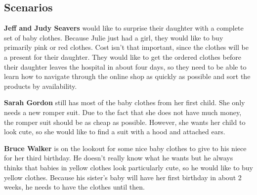 \subsection{Scenarios}
\textbf{Jeff and Judy Seavers} would like to surprise their daughter with a complete set of baby clothes.
Because Julie just had a girl, they would like to buy primarily pink or red clothes. Cost isn't that important, since the clothes will be a present for their daughter.
They would like to get the ordered clothes before their daughter leaves the hospital in about four days, so they need to be able to learn how to navigate through the online shop as quickly as possible and sort the products by availability.

\textbf{Sarah Gordon} still has most of the baby clothes from her first child. She only needs a new romper suit.
Due to the fact that she does not have much money, the romper suit should be as cheap as possible.
However, she wants her child to look cute, so she would like to find a suit with a hood and attached ears.

\textbf{Bruce Walker} is on the lookout for some nice baby clothes to give to his niece for her third birthday.
He doesn't really know what he wants but he always thinks that babies in yellow clothes look particularly cute, so he would like to buy yellow clothes.
Because his sister's baby will have her first birthday in about 2 weeks, he needs to have the clothes until then.

